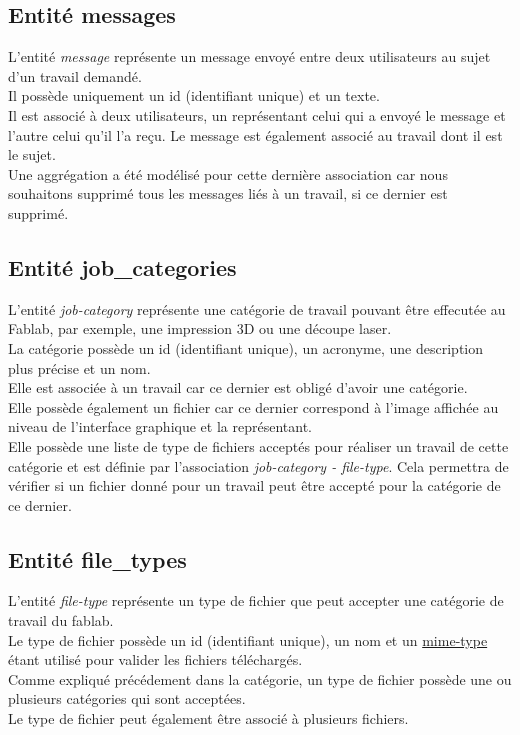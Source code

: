 \documentclass[
    iai, %
    il, %
]{heig-tb}
\begin{document}
\subsection{Entité messages}
L'entité \emph{message} représente un message envoyé entre deux utilisateurs au sujet d'un travail demandé.\\
Il possède uniquement un id (identifiant unique) et un texte.\\
Il est associé à deux utilisateurs, un représentant celui qui a envoyé le message et l'autre celui qu'il l'a reçu. Le message est également associé au travail dont il est le sujet.\\
Une aggrégation a été modélisé pour cette dernière association car nous souhaitons supprimé tous les messages liés à un travail, si ce dernier est supprimé.

\subsection{Entité job\_categories}
L'entité \emph{job-category} représente une catégorie de travail pouvant être effecutée au Fablab, par exemple, une impression 3D ou une découpe laser.\\
La catégorie possède un id (identifiant unique), un acronyme, une description plus précise et un nom.\\
Elle est associée à un travail car ce dernier est obligé d'avoir une catégorie.\\
Elle possède également un fichier car ce dernier correspond à l'image affichée au niveau de l'interface graphique et la représentant. \\
Elle possède une liste de type de fichiers acceptés pour réaliser un travail de cette catégorie et est définie par l'association \emph{job-category - file-type}. Cela permettra de vérifier si un fichier donné pour un travail peut être accepté pour la catégorie de ce dernier.

\subsection{Entité file\_types}
L'entité \emph{file-type} représente un type de fichier que peut accepter une catégorie de travail du \Gls{fablab}.\\
Le type de fichier possède un id (identifiant unique), un nom et un \href{https://developer.mozilla.org/fr/docs/Web/HTTP/Basics_of_HTTP/MIME_Types}{mime-type} étant utilisé pour valider les fichiers téléchargés. \\
Comme expliqué précédement dans la catégorie, un type de fichier possède une ou plusieurs catégories qui sont acceptées.\\
Le type de fichier peut également être associé à plusieurs fichiers.
\end{document}
